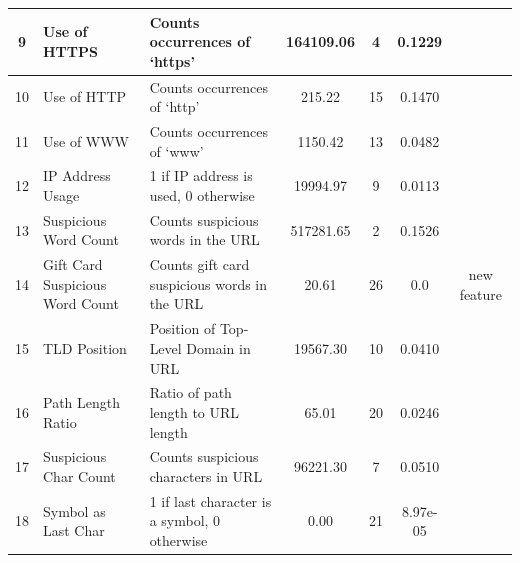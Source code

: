 \documentclass{article}
\begin{document}
\begin{table}[H]
\begin{adjustwidth}{-3cm}{}
\begin{tabular}{|c|p{4cm}|p{5cm}|c|c|c|c|}
                9            & Use of HTTPS                    & Counts occurrences of `https'                  & 164109.06          & 4                    & 0.1229                   & ~\cite{PhishSafe}                           \\ \hline
                10           & Use of HTTP                     & Counts occurrences of `http'                   & 215.22             & 15                   & 0.1470                   & ~\cite{PhishSafe,LexicalFeatureSelection}   \\ \hline
                11           & Use of WWW                      & Counts occurrences of `www'                    & 1150.42            & 13                   & 0.0482                   & ~\cite{PhishingURLDetection}                \\ \hline
                12           & IP Address Usage                & 1 if IP address is used, 0 otherwise           & 19994.97           & 9                    & 0.0113                   & ~\cite{LexicalFeatureSelection}             \\ \hline
                13           & Suspicious Word Count           & Counts suspicious words in the URL             & 517281.65          & 2                    & 0.1526                   & ~\cite{PhishSafe,LexicalFeatureSelection}   \\ \hline
                14           & Gift Card Suspicious Word Count & Counts gift card suspicious words in the URL   & 20.61              & 26                   & 0.0                      & new feature \\ \hline
                15           & TLD Position                    & Position of Top-Level Domain in URL            & 19567.30           & 10                   & 0.0410                   & ~\cite{PhishSafe}                           \\ \hline
                16           & Path Length Ratio               & Ratio of path length to URL length             & 65.01              & 20                   & 0.0246                   & ~\cite{LexicalFeatureSelection}             \\ \hline
                17           & Suspicious Char Count           & Counts suspicious characters in URL            & 96221.30           & 7                    & 0.0510                   & ~\cite{LexicalFeatureSelection}             \\ \hline
                18           & Symbol as Last Char             & 1 if last character is a symbol, 0 otherwise   & 0.00               & 21                   & 8.97e-05                 & ~\cite{LexicalFeatureSelection} \\ \hline

\end{tabular}
\end{adjustwidth}
\end{table}
\end{document}
